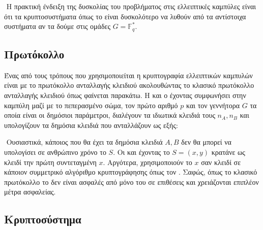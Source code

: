\documentclass[oneside,a4paper]{article}
\begin{document}
$ $\newline
Η πρακτική ένδειξη της δυσκολίας του προβλήματος στις ελλειπτικές καμπύλες είναι ότι τα κρυπτοσυστήματα όπως το  είναι δυσκολότερο να λυθούν από τα αντίστοιχα συστήματα αν τα δούμε στις ομάδες $G = \mathbb{F}_q^*$.
\subsection{Πρωτόκολλο }


 
\vspace*{0.3cm}
\noindent Ένας από τους τρόπους που χρησιμοποιείται η κρυπτογραφία ελλειπτικών καμπυλών είναι με το πρωτόκολλο ανταλλαγής κλειδιού  ακολουθώντας το κλασικό πρωτόκολλο ανταλλαγής κλειδιού  όπως φαίνεται παρακάτω. Η  και ο  έχοντας συμφωνήσει στην καμπύλη μαζί με το πεπερασμένο σώμα, τον πρώτο αριθμό $p$ και τον γεννήτορα $G$ τα οποία είναι οι δημόσιοι παράμετροι, διαλέγουν τα ιδιωτικά κλειδιά τους $n_A,n_B$ και υπολογίζουν τα δημόσια κλειδιά που ανταλλάζουν ως εξής: 

\vspace*{0.1cm}

$ $\newline
Ουσιαστικά, κάποιος που θα έχει τα δημόσια κλειδιά $A,B$ δεν θα μπορεί να υπολογίσει σε ανθρώπινο χρόνο το $S$. Οι  και  έχοντας το $S=(x,y)$ κρατάνε ως κλειδί την πρώτη συντεταγμένη $x$. Αργότερα, χρησιμοποιούν το $x$ σαν κλειδί σε κάποιον συμμετρικό αλγόριθμο κρυπτογράφησης όπως τον . Σαφώς, όπως το κλασικό πρωτόκολλο  το  δεν είναι ασφαλές από μόνο του σε  επιθέσεις και χρειάζονται επιπλέον μέτρα ασφαλείας. 

\subsection{Κρυπτοσύστημα }
\end{document}
